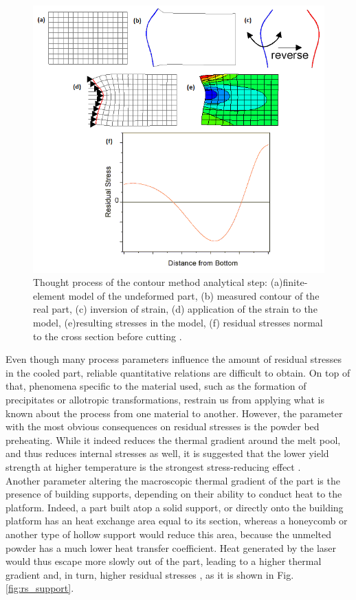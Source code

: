 \begin{figure}[ht]
	\centering
	\includegraphics[scale=0.60]{Images/contour_meth}
	\decoRule
	\caption[Thought process of the contour method analytical step]{Thought process of the contour method analytical step: (a)finite-element model of the undeformed part, (b) measured contour of the real part, (c) inversion of strain, (d) application of the strain to the model, (e)resulting stresses in the model, (f) residual stresses normal to the cross section before cutting \parencite{LANL}.}
	\label{fig:contour_meth}
\end{figure}


Even though many process parameters influence the amount of residual stresses in the cooled part, reliable quantitative relations are difficult to obtain. On top of that, phenomena specific to the material used, such as the formation of precipitates or allotropic transformations, restrain us from applying what is known about the process from one material to another. However, the parameter with the most obvious consequences on residual stresses is the powder bed preheating. While it indeed reduces the thermal gradient around the melt pool, and thus reduces internal stresses as well, it is suggested that the lower yield strength at higher temperature is the strongest stress-reducing effect \cite{Vrancken2016}. \\

Another parameter altering the macroscopic thermal gradient of the part is the presence of building supports, depending on their ability to conduct heat to the platform. Indeed, a part built atop a solid support, or directly onto the building platform has an heat exchange area equal to its section, whereas a honeycomb or another type of hollow support would reduce this area, because the unmelted powder has a much lower heat transfer coefficient\cite{Hodge2014}. Heat generated by the laser would thus escape more slowly out of the part, leading to a higher thermal gradient and, in turn, higher residual stresses \cite{Salmi2017}, as it is shown in Fig. \ref{fig:rs_support}.\\

